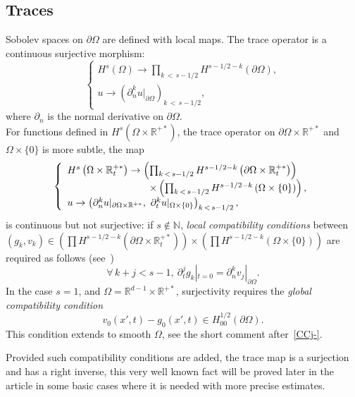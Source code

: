 \documentclass[AHL,Unicode,longabstracts,published]{cedram}
\newcommand{\R}{\mathbb{R}}
\newcommand{\N}{\mathbb{N}}
\let\oldforall\forall
\renewcommand*{\forall}{\mathrel{\oldforall}}
\newcommand{\N}{\mathbb{N}}
\begin{document}
\subsection{Traces}
Sobolev spaces on $\partial\Omega$ are defined with local maps. The trace operator is a continuous surjective morphism:
\[
\left\{
\begin{array}{ll}
H^s(\Omega)\to \prod_{k\,<\,s-1/2} H^{s-1/2-k}(\partial\Omega),\\
u\to \left(\partial_n^ku|_{\partial\Omega}\right)_{k\,<\,s-1/2},
\end{array}\right.
\]
where $\partial_n$ is the normal derivative on $\partial\Omega$.\\
For functions defined in $H^s(\Omega\times
\R^{+*})$, the trace operator on $\partial\Omega\times \R^{+*}$ and $\Omega\times \{0\}$ is more subtle, the map
\begin{equation}\label{trace2}
\left\{
\begin{array}{ll}
H^s\left(\Omega\times \R_t^{+*}\right)\to \left(\prod_{k\,<\,s-1/2} H^{s-1/2-k}\left(\partial\Omega\times \R_t^{+*}\right)\right)
\\
\mkern150mu\times \left(\prod_{k\,<\,s-1/2}H^{s-1/2-k}\left(\Omega \times \{0\}\right)\right),
\\
u\to \left(\partial_n^ku|_{\partial\Omega
\times \R^{+*}},\ \partial_t^ku|_{\Omega\times \{0\}}\right)_{k\,<\,s-1/2},
\end{array}\right.
\end{equation}
is continuous but not surjective: if $s\notin \N$,
\emph{local compatibility conditions} between $(g_k,v_k)\in (\prod H^{s-1/2-k}(\partial\Omega\times \R_t^{+*}))\times (\prod H^{s-1/2-k}(\Omega\times \{0\}))$ are required as follows (see~\cite{lionsmagenes2})
\begin{equation}\label{compaclassique1}
\forall\,k+j<s-1,\
\partial_t^jg_k|_{t=0}=\partial_n^kv_j|_{\partial\Omega}.
\end{equation}
In the case $s=1$, and $\Omega=\R^{d-1}
\times \R^{+*}$, surjectivity requires the \emph{global compatibility condition}
\begin{equation}\label{compaclassique2}
v_0(x',t)-g_0(x',t)\in H^{1/2}_{00}(\partial\Omega).
\end{equation}
This condition extends to smooth $\Omega$, see the short comment after~\eqref{CCj-}.


Provided such compatibility conditions are added, the trace map is a surjection and has a right inverse, this very well known fact will be proved later in the article in some basic cases where it is needed with more precise estimates.
\end{document}
